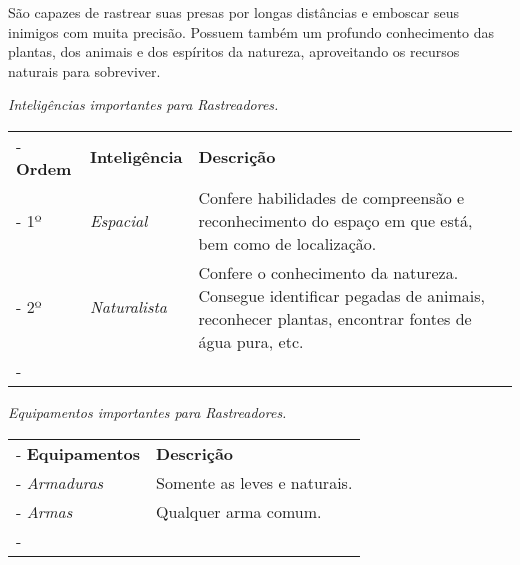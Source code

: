 São capazes de rastrear suas presas por longas distâncias e emboscar seus inimigos com muita precisão. Possuem também um profundo conhecimento das plantas, dos animais e dos espíritos da natureza, aproveitando os recursos naturais para sobreviver. 

\begin{table}[htb]
	\centering\smaller
	\emph{Inteligências importantes para Rastreadores.} \\
	\begin{tabu} to \textwidth {|X[c 0.5]|X[1]|X[3]|} \tabucline-
		\textbf{Ordem}	& \textbf{Inteligência}	&	\textbf{Descrição}	\\ \tabucline-
		1º		& \emph{Espacial}  	& Confere habilidades de compreensão e reconhecimento do espaço em que está, bem como de localização. 	\\ \tabucline-
		2º		& \emph{Naturalista} & Confere o conhecimento da natureza. Consegue identificar pegadas de animais, reconhecer plantas, encontrar fontes de água pura, etc. \\ \tabucline-
	\end{tabu}
\end{table}

\begin{table}[htb]
	\centering\smaller
	\emph{Equipamentos importantes para Rastreadores.}
	\begin{tabu} to \textwidth {|X[0.5]|X[3]|} \tabucline-
		\textbf{Equipamentos}	&	\textbf{Descrição}	\\ \tabucline-
		\emph{Armaduras} & Somente as leves e naturais.	\\ \tabucline-
		\emph{Armas} & Qualquer arma comum. \\ \tabucline-
	\end{tabu}
\end{table}


